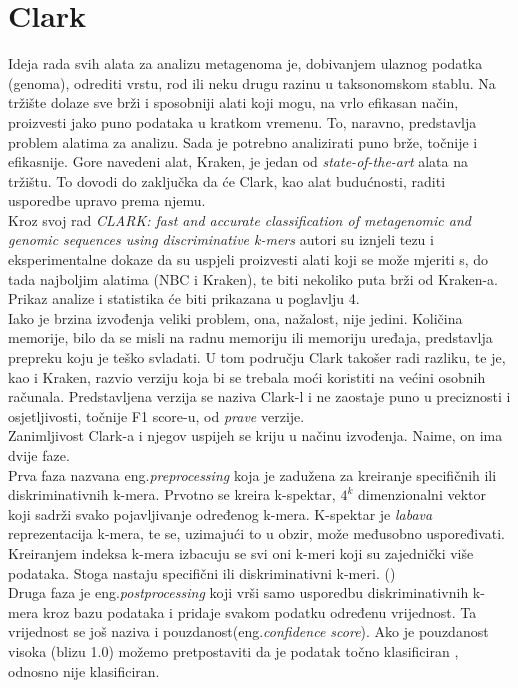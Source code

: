 \documentclass[times, utf8, seminar]{fer}
\begin{document}
\section{Clark}
Ideja rada svih alata za analizu metagenoma je, dobivanjem ulaznog podatka (genoma), odrediti vrstu, rod ili neku drugu razinu u taksonomskom stablu. Na tržište dolaze sve brži i sposobniji alati koji mogu, na vrlo efikasan način, proizvesti jako puno podataka u kratkom vremenu. To, naravno, predstavlja problem alatima za analizu. Sada je potrebno analizirati puno brže, točnije i efikasnije. Gore navedeni alat, Kraken, je jedan od \textit{state-of-the-art} alata na tržištu. To dovodi do zaključka da će Clark, kao alat budućnosti, raditi usporedbe upravo prema njemu.
\\Kroz svoj rad \textit{CLARK: fast and accurate classification of metagenomic and genomic sequences using discriminative k-mers} autori su iznjeli tezu i eksperimentalne dokaze da su uspjeli proizvesti alati koji se može mjeriti s, do tada najboljim alatima (NBC i Kraken), te biti nekoliko puta brži od Kraken-a. Prikaz analize i statistika će biti prikazana u poglavlju 4.
\\Iako je brzina izvođenja veliki problem, ona, nažalost, nije jedini. Količina memorije, bilo da se misli na radnu memoriju ili memoriju uređaja, predstavlja prepreku koju je teško svladati. U tom području Clark takošer radi razliku, te je, kao i Kraken, razvio verziju koja bi se trebala moći koristiti na većini osobnih računala. Predstavljena verzija se naziva Clark-l i ne zaostaje puno u preciznosti i osjetljivosti, točnije F1 score-u, od \textit{prave} verzije.
\\Zanimljivost Clark-a i njegov uspijeh se kriju u načinu izvođenja. Naime, on ima dvije faze. \\Prva faza nazvana eng.\textit{preprocessing} koja je zadužena za kreiranje specifičnih ili diskriminativnih k-mera. Prvotno se kreira k-spektar, ${4}^{k}$ dimenzionalni vektor koji sadrži svako pojavljivanje određenog k-mera. K-spektar je \textit{labava} reprezentacija k-mera, te se, uzimajući to u obzir, može međusobno uspoređivati. Kreiranjem indeksa k-mera izbacuju se svi oni k-meri koji su zajednički više podataka. Stoga nastaju specifični ili diskriminativni k-meri. (\cite{CLARK})
\\Druga faza je eng.\textit{postprocessing} koji vrši samo usporedbu diskriminativnih k-mera kroz bazu podataka i pridaje svakom podatku određenu vrijednost. Ta vrijednost se još naziva i pouzdanost(eng.\textit{confidence score}). Ako je pouzdanost visoka (blizu 1.0) možemo pretpostaviti da je podatak točno klasificiran , odnosno nije klasificiran.
\end{document}
